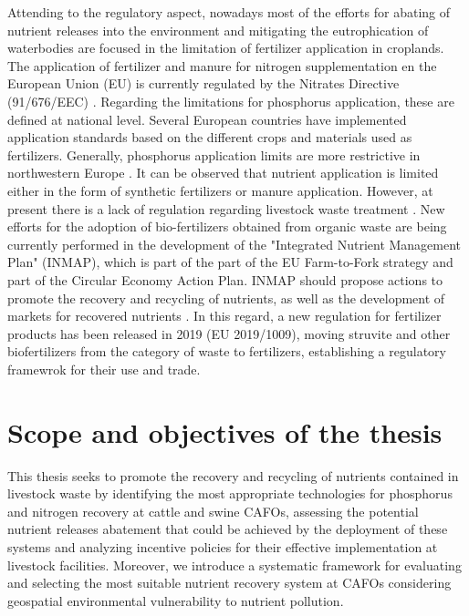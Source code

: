 \begin{refsection}[referencesCh1]
Attending to the regulatory aspect, nowadays most of the efforts for abating of nutrient releases into the environment and mitigating the eutrophication of waterbodies are focused in the limitation of fertilizer application in croplands. The application of fertilizer and manure for nitrogen supplementation en the European Union (EU) is currently regulated by the Nitrates Directive (91/676/EEC) \citep{GRIZZETTI2021102281}. Regarding the limitations for phosphorus application, these are defined at national level. Several European countries have implemented application standards based on the different crops and materials used as fertilizers. Generally, phosphorus application limits are more restrictive in northwestern Europe \citep{amery2014agricultural}. It can be observed that nutrient application is limited either in the form of synthetic fertilizers or manure application. However, at present there is a lack of regulation regarding livestock waste treatment \citep{Piot_Lepetit2012}. New efforts for the adoption of bio-fertilizers obtained from organic waste are being currently performed in the development of the "Integrated Nutrient Management Plan" (INMAP), which is part of the part of the EU Farm-to-Fork strategy and part of the Circular Economy Action Plan. INMAP should propose actions to promote the recovery and recycling of nutrients, as well as the development of markets for recovered nutrients \citep{ESSP2021, CircularEconomyActionPlan}. In this regard, a new regulation for fertilizer products has been released in 2019 (EU 2019/1009), moving struvite and other biofertilizers from the category of waste to fertilizers, establishing a regulatory framewrok for their use and trade.




\section{Scope and objectives of the thesis}
This thesis seeks to promote the recovery and recycling of nutrients contained in livestock waste by identifying the most appropriate technologies for phosphorus and nitrogen recovery at cattle and swine CAFOs, assessing the potential nutrient releases abatement that could be achieved by the deployment of these systems and analyzing incentive policies for their effective implementation at livestock facilities. Moreover, we introduce a systematic framework for evaluating and selecting the most suitable nutrient recovery system at CAFOs considering geospatial environmental vulnerability to nutrient pollution. 

\end{refsection}
